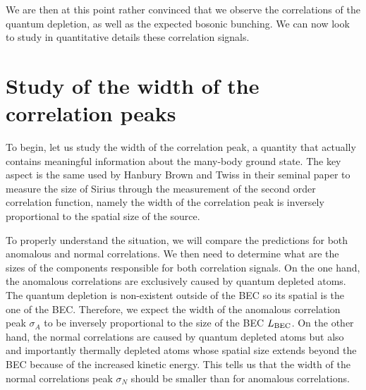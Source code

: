 We are then at this point rather convinced that we observe the \kmk correlations of the quantum depletion, as well as the expected bosonic bunching. We can now look to study in quantitative details these correlation signals. 



\section{Study of the width of the correlation peaks}

To begin, let us study the width of the correlation peak, a quantity that actually contains meaningful information about the many-body ground state. The key aspect is the same used by Hanbury Brown and Twiss in their seminal paper to measure the size of Sirius through the measurement of the second order correlation function, namely the width of the correlation peak is inversely proportional to the spatial size of the source. 


To properly understand the situation, we will compare the predictions for both anomalous and normal correlations. We then need to determine what are the sizes of the components responsible for both correlation signals. On the one hand, the anomalous correlations are exclusively caused by quantum depleted atoms. The quantum depletion is non-existent outside of the BEC so its spatial is the one of the BEC. Therefore, we expect the width of the anomalous correlation peak $\sigma_A$ to be inversely proportional to the size of the BEC $L_{\rm{BEC}}$. On the other hand, the normal correlations are caused by quantum depleted atoms but also and importantly thermally depleted atoms whose spatial size extends beyond the BEC because of the increased kinetic energy. This tells us that the width of the normal correlations peak $\sigma_N$ should be smaller than for anomalous correlations.

